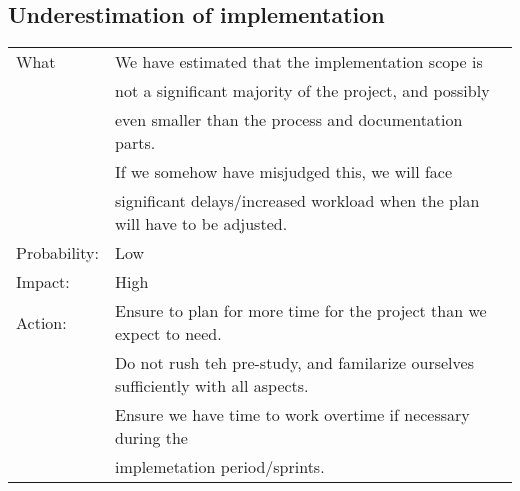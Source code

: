 \documentclass[12pt, a4paper]{article}
\begin{document}
\subsection{Underestimation of implementation}
\begin{tabular}{| l | l |}
	\hline
	What & We have estimated that the implementation scope is \\
	&not a significant majority of the project, and possibly \\
	&even smaller than the process and documentation parts. \\
	& If we somehow have misjudged this, we will face \\
	& significant delays/increased workload when the plan will have to be adjusted.\\
	\hline
	Probability: & Low \\
	\hline
	Impact: & High \\
	\hline
	Action: & Ensure to plan for more time for the project than we expect to need.\\
	& Do not rush teh pre-study, and familarize ourselves sufficiently with all aspects.\\
	& Ensure we have time to work overtime if necessary during the\\
	& implemetation period/sprints.\\
	\hline

\end{tabular}
\end{document}
